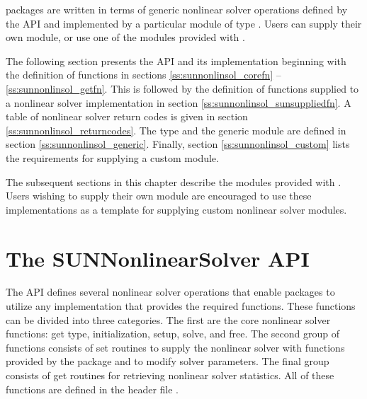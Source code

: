 {\sundials} packages are written in terms of generic nonlinear solver
operations defined by the {\sunnonlinsol} API and implemented by a
particular {\sunnonlinsol} module of type .
Users can supply their own {\sunnonlinsol} module, or use one of the
modules provided with {\sundials}.

The following section presents the {\sunnonlinsol} API and its
implementation beginning with the definition of {\sunnonlinsol}
functions in sections \ref{ss:sunnonlinsol_corefn}
-- \ref{ss:sunnonlinsol_getfn}. This is followed by the definition of
functions supplied to a nonlinear solver implementation in section
\ref{ss:sunnonlinsol_sunsuppliedfn}. A table of nonlinear solver
return codes is given in section \ref{ss:sunnonlinsol_returncodes}.
The  type and the generic {\sunnonlinsol}
module are defined in section \ref{ss:sunnonlinsol_generic}. Finally,
section \ref{ss:sunnonlinsol_custom} lists the requirements for
supplying a custom {\sunnonlinsol} module.

The subsequent sections in this chapter describe the {\sunnonlinsol}
modules provided with {\sundials}. Users wishing to supply their own
{\sunnonlinsol} module are encouraged to use these implementations as
a template for supplying custom nonlinear solver modules. 


\section{The SUNNonlinearSolver API}
\label{s:sunnonlinsol_api}

The {\sunnonlinsol} API defines several nonlinear solver operations
that enable {\sundials} packages to utilize any {\sunnonlinsol}
implementation that provides the required functions. These functions
can be divided into three categories. The first are the core nonlinear
solver functions: get type, initialization, setup, solve, and free.
The second group of functions consists of set routines to supply the
nonlinear solver with functions provided by the {\sundials} package
and to modify solver parameters. The final group consists of get
routines for retrieving nonlinear solver statistics. All of these
functions are defined in the header file
.

